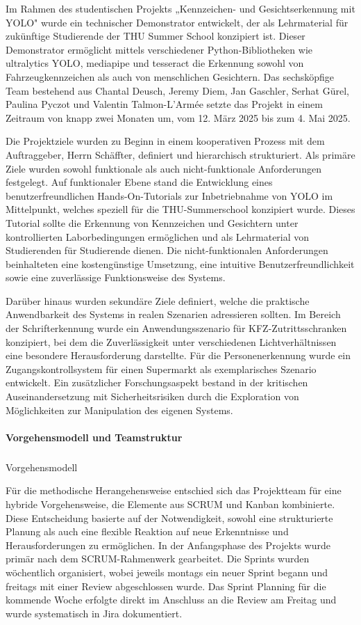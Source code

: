 Im Rahmen des studentischen Projekts „Kennzeichen- und Gesichtserkennung mit YOLO" wurde ein technischer Demonstrator entwickelt, der als Lehrmaterial für zukünftige Studierende der THU Summer School konzipiert ist. Dieser Demonstrator ermöglicht mittels verschiedener Python-Bibliotheken wie ultralytics YOLO, mediapipe und tesseract die Erkennung sowohl von Fahrzeugkennzeichen als auch von menschlichen Gesichtern. Das sechsköpfige Team bestehend aus Chantal Deusch, Jeremy Diem, Jan Gaschler, Serhat Gürel, Paulina Pyczot und Valentin Talmon-L'Armée setzte das Projekt in einem Zeitraum von knapp zwei Monaten um, vom 12. März 2025 bis zum 4. Mai 2025.

Die Projektziele wurden zu Beginn in einem kooperativen Prozess mit dem Auftraggeber, Herrn Schäffter, definiert und hierarchisch strukturiert. Als primäre Ziele wurden sowohl funktionale als auch nicht-funktionale Anforderungen festgelegt. Auf funktionaler Ebene stand die Entwicklung eines benutzerfreundlichen Hands-On-Tutorials zur Inbetriebnahme von YOLO im Mittelpunkt, welches speziell für die THU-Summerschool konzipiert wurde. Dieses Tutorial sollte die Erkennung von Kennzeichen und Gesichtern unter kontrollierten Laborbedingungen ermöglichen und als Lehrmaterial von Studierenden für Studierende dienen. Die nicht-funktionalen Anforderungen beinhalteten eine kostengünstige Umsetzung, eine intuitive Benutzerfreundlichkeit sowie eine zuverlässige Funktionsweise des Systems.

Darüber hinaus wurden sekundäre Ziele definiert, welche die praktische Anwendbarkeit des Systems in realen Szenarien adressieren sollten. Im Bereich der Schrifterkennung wurde ein Anwendungsszenario für KFZ-Zutrittsschranken konzipiert, bei dem die Zuverlässigkeit unter verschiedenen Lichtverhältnissen eine besondere Herausforderung darstellte. Für die Personenerkennung wurde ein Zugangskontrollsystem für einen Supermarkt als exemplarisches Szenario entwickelt. Ein zusätzlicher Forschungsaspekt bestand in der kritischen Auseinandersetzung mit Sicherheitsrisiken durch die Exploration von Möglichkeiten zur Manipulation des eigenen Systems.

\paragraph{Vorgehensmodell und Teamstruktur}

\subparagraph{}{Vorgehensmodell}

Für die methodische Herangehensweise entschied sich das Projektteam für eine hybride Vorgehensweise, die Elemente aus SCRUM und Kanban kombinierte. Diese Entscheidung basierte auf der Notwendigkeit, sowohl eine strukturierte Planung als auch eine flexible Reaktion auf neue Erkenntnisse und Herausforderungen zu ermöglichen. In der Anfangsphase des Projekts wurde primär nach dem SCRUM-Rahmenwerk gearbeitet. Die Sprints wurden wöchentlich organisiert, wobei jeweils montags ein neuer Sprint begann und freitags mit einer Review abgeschlossen wurde. Das Sprint Planning für die kommende Woche erfolgte direkt im Anschluss an die Review am Freitag und wurde systematisch in Jira dokumentiert.

